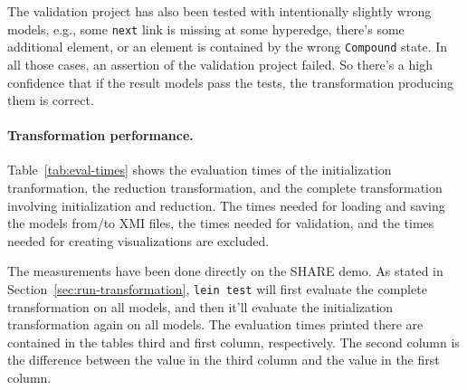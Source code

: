 \documentclass[11pt]{article}
\begin{document}
The validation project has also been tested with intentionally slightly wrong
models, e.g., some \verb|next| link is missing at some hyperedge, there's some
additional element, or an element is contained by the wrong \verb|Compound|
state.  In all those cases, an assertion of the validation project failed.  So
there's a high confidence that if the result models pass the tests, the
transformation producing them is correct.

\paragraph{Transformation performance.}


Table~\ref{tab:eval-times} shows the evaluation times of the initialization
tranformation, the reduction transformation, and the complete transformation
involving initialization and reduction.  The times needed for loading and
saving the models from/to XMI files, the times needed for validation, and the
times needed for creating visualizations are excluded.

The measurements have been done directly on the SHARE demo.  As stated in
Section~\ref{sec:run-transformation}, \verb|lein test| will first evaluate the
complete transformation on all models, and then it'll evaluate the
initialization transformation again on all models.  The evaluation times
printed there are contained in the tables third and first column, respectively.
The second column is the difference between the value in the third column and
the value in the first column.
\end{document}
